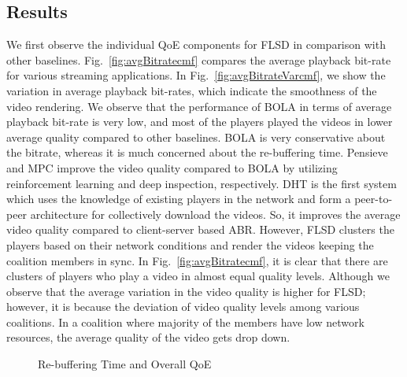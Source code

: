 \subsection{Results}
We first observe the individual QoE components for FLSD in comparison with other baselines. Fig.~\ref{fig:avgBitratecmf} compares the average playback bit-rate for various streaming applications. In Fig.~\ref{fig:avgBitrateVarcmf}, we show the variation in average playback bit-rates, which indicate the smoothness of the video rendering. We observe that the performance of BOLA in terms of average playback bit-rate is very low, and most of the players played the videos in lower average quality compared to other baselines. BOLA is very conservative about the bitrate, whereas it is much concerned about the re-buffering time. Pensieve and MPC improve the video quality compared to BOLA by utilizing reinforcement learning and deep inspection, respectively. DHT is the first system which uses the knowledge of existing players in the network and form a peer-to-peer architecture for collectively download the videos. So, it improves the average video quality compared to client-server based ABR. However, FLSD clusters the players based on their network conditions and render the videos keeping the coalition members in sync. In Fig.~\ref{fig:avgBitratecmf}, it is clear that there are clusters of players who play a video in almost equal quality levels. Although we observe that the average variation in the video quality is higher for FLSD; however, it is because the deviation of video quality levels among various coalitions. In a coalition where majority of the members have low network resources, the average quality of the video gets drop down. 
\begin{figure}[!ht]
	\captionsetup[subfigure]{}
	\begin{center}
	\end{center}
	\caption{\label{fig:avgBitrateVar} Re-buffering Time and Overall QoE}
\end{figure}
